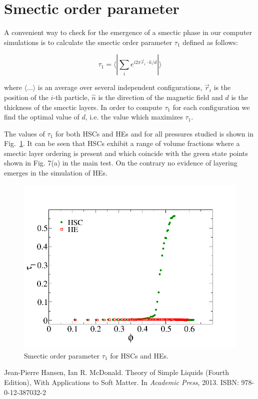 \documentclass{article}
\begin{document}
\newpage

\section{Smectic order parameter}

A convenient way to check for the emergence of a smectic phase in our computer simulations 
is to calculate the smectic order parameter $\tau_1$ defined as follows:

\begin{equation}
    \tau_1 = \langle | \sum_i e^{i 2\pi \vec{r}_i \cdot \hat{n} / d } |\rangle 
\end{equation}

where $\langle\ldots\rangle$ is an average over several independent configurations, $\vec{r}_i$ is the position of the $i$-th particle, $\hat{n}$ is the direction of the magnetic
field and $d$ is the thickness of the smectic layers.
In order to compute $\tau_1$ for each configuration we find the optimal value of $d$, i.e. 
the value which maximizes $\tau_1$.

The values of $\tau_1$ for both HSCs and HEs and for all pressures studied is shown in Fig.~\ref{fig:smordpar}. It can be seen that HSCs exhibit a range of volume fractions where 
a smectic layer ordering is present and which coincide with the green state points shown in Fig. 7(a)
in the main test. On the contrary no evidence of layering emerges in the simulation of HEs.

\begin{figure}
    \centering
    \includegraphics[width=1\columnwidth]{smordpar.png}
    \caption{Smectic order parameter $\tau_1$ for HSCs and HEs.}
    \label{fig:smordpar}
\end{figure}

\begin{thebibliography}{1}
Jean-Pierre Hansen, Ian R. McDonald.
\newblock Theory of Simple Liquids (Fourth Edition), With Applications to Soft Matter.
\newblock In {\em Academic Press}, 2013. ISBN: 978-0-12-387032-2


\end{thebibliography}
\end{document}
